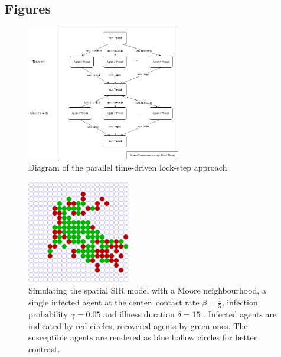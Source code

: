 \documentclass{bmcart}
\begin{document}
\begin{backmatter}

\section*{Figures}
\begin{figure}[h!]
	\includegraphics[width=0.6\textwidth, angle=0]{./stm_abs.png}
	\caption{Diagram of the parallel time-driven lock-step approach.}
	\label{fig:stm_abs_structure}
\end{figure}

\begin{figure}[h!]
	\includegraphics[width=0.4\textwidth, angle=0]{./sir_vis.png}
	\caption{Simulating the spatial SIR model with a Moore neighbourhood, a single infected agent at the center, contact rate $\beta = \frac{1}{5}$, infection probability $\gamma = 0.05$ and illness duration $\delta = 15$ . Infected agents are indicated by red circles, recovered agents by green ones. The susceptible agents are rendered as blue hollow circles for better contrast.}
	\label{fig:vis_sir}
\end{figure}


\end{backmatter}
\end{document}
